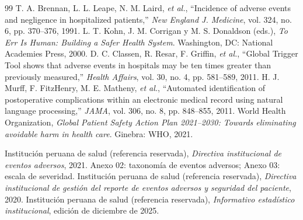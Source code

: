 \documentclass[conference]{IEEEtran}
\begin{document}
\begin{thebibliography}{99}
 T. A. Brennan, L. L. Leape, N. M. Laird, \emph{et al.},
``Incidence of adverse events and negligence in hospitalized patients,''
\emph{New England J. Medicine}, vol. 324, no. 6, pp. 370--376, 1991.
 L. T. Kohn, J. M. Corrigan y M. S. Donaldson (eds.),
\emph{To Err Is Human: Building a Safer Health System}. Washington, DC:
National Academies Press, 2000.
 D. C. Classen, R. Resar, F. Griffin, \emph{et al.},
``Global Trigger Tool shows that adverse events in hospitals may be ten times
greater than previously measured,'' \emph{Health Affairs}, vol. 30, no. 4,
pp. 581--589, 2011.
 H. J. Murff, F. FitzHenry, M. E. Matheny, \emph{et al.},
``Automated identification of postoperative complications within an electronic
medical record using natural language processing,'' \emph{JAMA}, vol. 306,
no. 8, pp. 848--855, 2011.
 World Health Organization, \emph{Global Patient Safety Action
Plan 2021--2030: Towards eliminating avoidable harm in health care}. Ginebra:
WHO, 2021.

 Institución peruana de salud (referencia
reservada), \emph{Directiva institucional de eventos adversos}, 2021.
Anexo 02: taxonomía de eventos adversos; Anexo 03: escala de severidad.
 Institución peruana de salud (referencia
reservada), \emph{Directiva institucional de gestión del reporte de
eventos adversos y seguridad del paciente}, 2020.
 Institución peruana de salud (referencia reservada),
\emph{Informativo estadístico institucional}, edición de diciembre de
2025.
\end{thebibliography}
\end{document}
